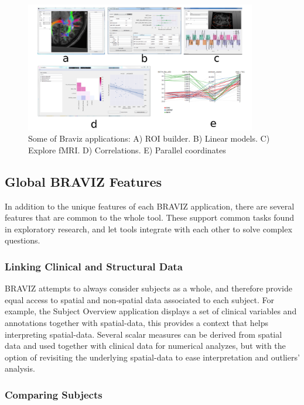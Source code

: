 \documentclass[twocolumn]{svjour3}
\begin{document}
\begin{figure}
\begin{center}
\includegraphics[width=0.9\textwidth]{figures/many_apps.png}
\end{center}
 \caption{\label{fig_other_apps} Some of Braviz applications:  A) ROI builder. B) Linear models. C) Explore fMRI. D) Correlations. E) Parallel coordinates}
\end{figure}



\subsection{Global BRAVIZ Features}

In addition to the unique features of each BRAVIZ application, there are several features that are common to the whole tool. These support common tasks found in exploratory research, and let tools integrate with each other to solve complex questions.

\subsubsection{Linking Clinical and Structural Data}

BRAVIZ attempts to always consider subjects as a whole, and therefore provide equal access to spatial and non-spatial data associated to each subject. For example, the Subject Overview application displays a set of clinical variables and annotations together with spatial-data, this provides a context that helps interpreting spatial-data. Several scalar measures can be derived from spatial data and used together with clinical data for numerical analyzes, but with the option of revisiting the underlying spatial-data to ease interpretation and outliers' analysis.

\subsubsection{Comparing Subjects}
\end{document}
